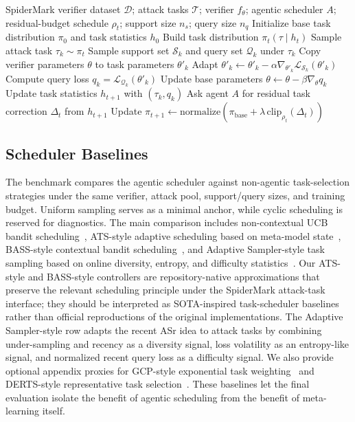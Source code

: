 \begin{algorithm}[t]
\caption{Agentic MetaSpiderMark Training}
\label{alg:metaspidermark}
\begin{algorithmic}[1]
\Require SpiderMark verifier dataset $\mathcal{D}$; attack tasks $\mathcal{T}$; verifier $f_\theta$; agentic scheduler $A$; residual-budget schedule $\rho_t$; support size $n_s$; query size $n_q$
\State Initialize base task distribution $\pi_0$ and task statistics $h_0$
    \State Build task distribution $\pi_t(\tau \mid h_t)$
    \State Sample attack task $\tau_k \sim \pi_t$
    \State Sample support set $\mathcal{S}_k$ and query set $\mathcal{Q}_k$ under $\tau_k$
    \State Copy verifier parameters $\theta$ to task parameters $\theta'_k$
    \State Adapt $\theta'_k \leftarrow \theta'_k - \alpha\nabla_{\theta'_k}\mathcal{L}_{\mathcal{S}_k}(\theta'_k)$
    \State Compute query loss $q_k = \mathcal{L}_{\mathcal{Q}_k}(\theta'_k)$
    \State Update base parameters $\theta \leftarrow \theta - \beta\nabla_{\theta}q_k$
    \State Update task statistics $h_{t+1}$ with $(\tau_k, q_k)$
        \State Ask agent $A$ for residual task correction $\Delta_t$ from $h_{t+1}$
        \State Update $\pi_{t+1} \leftarrow \mathrm{normalize}(\pi_{\mathrm{base}} + \lambda\,\mathrm{clip}_{\rho_t}(\Delta_t))$
    \EndIf
\EndFor
\end{algorithmic}
\end{algorithm}

\subsection{Scheduler Baselines}

The benchmark compares the agentic scheduler against non-agentic task-selection strategies under the same verifier, attack pool, support/query sizes, and training budget.
Uniform sampling serves as a minimal anchor, while cyclic scheduling is reserved for diagnostics.
The main comparison includes non-contextual UCB bandit scheduling~\cite{auer2002finite}, ATS-style adaptive scheduling based on meta-model state~\cite{yao2021ats}, BASS-style contextual bandit scheduling~\cite{ban2023bass}, and Adaptive Sampler-style task sampling based on online diversity, entropy, and difficulty statistics~\cite{wang2024tasksampler}.
Our ATS-style and BASS-style controllers are repository-native approximations that preserve the relevant scheduling principle under the SpiderMark attack-task interface; they should be interpreted as SOTA-inspired task-scheduler baselines rather than official reproductions of the original implementations.
The Adaptive Sampler-style row adapts the recent ASr idea to attack tasks by combining under-sampling and recency as a diversity signal, loss volatility as an entropy-like signal, and normalized recent query loss as a difficulty signal.
We also provide optional appendix proxies for GCP-style exponential task weighting~\cite{liu2020adaptive} and DERTS-style representative task selection~\cite{zhan2024derts}.
These baselines let the final evaluation isolate the benefit of agentic scheduling from the benefit of meta-learning itself.

